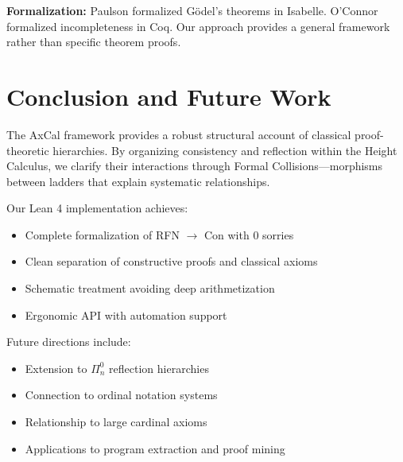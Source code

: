 \documentclass[11pt]{article}
\begin{document}
\textbf{Formalization:} Paulson \cite{Paulson2014} formalized Gödel's theorems in Isabelle. O'Connor \cite{OConnor2005} formalized incompleteness in Coq. Our approach provides a general framework rather than specific theorem proofs.

\section{Conclusion and Future Work}

The AxCal framework provides a robust structural account of classical proof-theoretic hierarchies. By organizing consistency and reflection within the Height Calculus, we clarify their interactions through Formal Collisions—morphisms between ladders that explain systematic relationships.

Our Lean 4 implementation achieves:
\begin{itemize}
\item Complete formalization of RFN $\to$ Con with 0 sorries
\item Clean separation of constructive proofs and classical axioms
\item Schematic treatment avoiding deep arithmetization
\item Ergonomic API with automation support
\end{itemize}

Future directions include:
\begin{itemize}
\item Extension to $\Pi^0_n$ reflection hierarchies
\item Connection to ordinal notation systems
\item Relationship to large cardinal axioms
\item Applications to program extraction and proof mining
\end{itemize}
\end{document}

